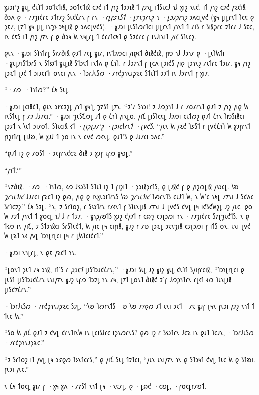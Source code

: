 𐑣𐑨𐑮𐑦'𐑟 𐑣𐑧𐑛 𐑒𐑧𐑐𐑑 𐑮𐑴𐑑𐑱𐑑𐑦𐑙, 𐑮𐑴𐑑𐑱𐑑𐑦𐑙 𐑤𐑲𐑒 𐑦𐑑 𐑢𐑪𐑟 𐑑𐑮𐑲𐑦𐑙 𐑑 𐑢𐑲𐑯𐑛 𐑦𐑑𐑕𐑧𐑤𐑓 𐑪𐑓 𐑣𐑦𐑟 𐑯𐑧𐑒. 𐑦𐑑 𐑢𐑪𐑟 𐑤𐑲𐑒 𐑢𐑷𐑒𐑦𐑙 𐑔𐑮𐑵 𐑞 ·𐑥𐑨𐑡𐑦𐑒𐑩𐑤 𐑲𐑑𐑩𐑥𐑟 𐑕𐑧𐑒𐑖𐑩𐑯 𐑝 𐑩𐑯 \emph{·𐑩𐑛𐑝𐑭𐑯𐑕𐑑 ·𐑛𐑳𐑯𐑡𐑩𐑯𐑟 𐑯 ·𐑛𐑮𐑨𐑜𐑩𐑯𐑟} 𐑮𐑵𐑤𐑚𐑫𐑒 (𐑣𐑰 𐑛𐑦𐑛𐑩𐑯𐑑 𐑐𐑤𐑱 𐑞 𐑜𐑱𐑥, 𐑚𐑳𐑑 𐑣𐑰 𐑛𐑦𐑛 𐑦𐑯𐑡𐑶 𐑮𐑰𐑛𐑦𐑙 𐑞 𐑮𐑵𐑤𐑚𐑫𐑒𐑕). ·𐑣𐑨𐑮𐑦 𐑛𐑧𐑕𐑐𐑼𐑩𐑑𐑤𐑦 𐑛𐑦𐑛𐑩𐑯𐑑 𐑢𐑪𐑯𐑑 𐑑 𐑥𐑦𐑕 𐑩 𐑕𐑦𐑙𐑜𐑩𐑤 𐑲𐑑𐑩𐑥 𐑓 𐑕𐑱𐑤, 𐑦𐑯 𐑒𐑱𐑕 𐑦𐑑 𐑢𐑪𐑟 𐑢𐑳𐑯 𐑝 𐑞 𐑔𐑮𐑰 𐑿 𐑯𐑰𐑛𐑩𐑛 𐑑 𐑒𐑩𐑥𐑐𐑤𐑰𐑑 𐑞 𐑕𐑲𐑒𐑩𐑤 𐑝 𐑦𐑯𐑓𐑦𐑯𐑦𐑑 \emph{𐑢𐑦𐑖} 𐑕𐑐𐑧𐑤𐑟.

𐑞𐑧𐑯 ·𐑣𐑨𐑮𐑦 𐑕𐑐𐑪𐑑𐑩𐑛 𐑕𐑳𐑥𐑔𐑦𐑙 𐑞𐑨𐑑 𐑥𐑱𐑛 𐑣𐑦𐑥, 𐑦𐑯𐑑𐑲𐑼𐑤𐑦 𐑢𐑦𐑞𐑬𐑑 𐑔𐑦𐑙𐑒𐑦𐑙, 𐑝𐑽 𐑪𐑓 𐑓𐑮𐑪𐑥 𐑞 ·𐑛𐑧𐑐𐑿𐑑𐑦 ·𐑣𐑧𐑛𐑥𐑦𐑕𐑑𐑮𐑩𐑕 𐑯 𐑕𐑑𐑸𐑑 𐑣𐑧𐑛𐑦𐑙 𐑕𐑑𐑮𐑱𐑑 𐑦𐑯𐑑𐑵 𐑞 𐑖𐑪𐑐, 𐑩 𐑓𐑮𐑳𐑯𐑑 𐑝 𐑚𐑤𐑵 𐑚𐑮𐑦𐑒𐑕 𐑢𐑦𐑞 𐑚𐑮𐑪𐑯𐑟-𐑥𐑧𐑑𐑩𐑤 𐑑𐑮𐑦𐑥. 𐑣𐑰 𐑢𐑪𐑟 𐑚𐑮𐑷𐑑 𐑚𐑨𐑒 𐑑 𐑮𐑦𐑨𐑤𐑦𐑑𐑦 𐑴𐑯𐑤𐑦 𐑢𐑧𐑯 ·𐑐𐑮𐑩𐑓𐑧𐑕𐑼 ·𐑥𐑩𐑒𐑜𐑪𐑯𐑨𐑜𐑷𐑤 𐑕𐑑𐑧𐑐𐑑 𐑮𐑲𐑑 𐑦𐑯 𐑓𐑮𐑳𐑯𐑑 𐑝 𐑣𐑦𐑥.

“·𐑥𐑼~·𐑐𐑪𐑑𐑼?” 𐑖𐑰 𐑕𐑧𐑛.

·𐑣𐑨𐑮𐑦 𐑚𐑤𐑦𐑙𐑒𐑑, 𐑞𐑧𐑯 𐑮𐑾𐑤𐑲𐑟𐑛 𐑢𐑪𐑑 𐑣𐑰'𐑛 𐑡𐑳𐑕𐑑 𐑛𐑳𐑯. “𐑲'𐑥 𐑕𐑪𐑮𐑦! 𐑲 𐑓𐑼𐑜𐑪𐑑 𐑓 𐑩 𐑥𐑴𐑥𐑩𐑯𐑑 𐑞𐑨𐑑 𐑲 𐑢𐑪𐑟 𐑢𐑦𐑞 𐑿 𐑦𐑯𐑕𐑑𐑧𐑛 𐑝 𐑥𐑲 𐑓𐑨𐑥𐑤𐑦.” ·𐑣𐑨𐑮𐑦 𐑡𐑧𐑕𐑗𐑼𐑛 𐑨𐑑 𐑞 𐑖𐑪𐑐 𐑢𐑦𐑯𐑛𐑴, 𐑢𐑦𐑗 𐑛𐑦𐑕𐑐𐑤𐑱𐑛 𐑓𐑲𐑼𐑦 𐑤𐑧𐑑𐑼𐑟 𐑞𐑨𐑑 𐑖𐑪𐑯 𐑐𐑽𐑕𐑦𐑙𐑤𐑦 𐑚𐑮𐑲𐑑 𐑯 𐑘𐑧𐑑 𐑮𐑦𐑥𐑴𐑑, 𐑕𐑐𐑧𐑤𐑦𐑙 𐑬𐑑 \emph{·𐑚𐑦𐑜𐑚𐑨𐑥'𐑟 ·𐑚𐑮𐑦𐑤𐑘𐑩𐑯𐑑 ·𐑚𐑫𐑒𐑕}. “𐑢𐑧𐑯 𐑿 𐑢𐑷𐑒 𐑐𐑭𐑕𐑑 𐑩 𐑚𐑫𐑒𐑖𐑪𐑐 𐑿 𐑣𐑨𐑝𐑩𐑯𐑑 𐑝𐑦𐑟𐑦𐑑𐑩𐑛 𐑚𐑦𐑓𐑹, 𐑿 𐑣𐑨𐑓 𐑑 𐑜𐑴 𐑦𐑯 𐑯 𐑤𐑫𐑒 𐑼𐑬𐑯𐑛. 𐑞𐑨𐑑'𐑕 𐑞 𐑓𐑨𐑥𐑤𐑦 𐑮𐑵𐑤.”

“𐑞𐑨𐑑 𐑦𐑟 𐑞 𐑥𐑴𐑕𐑑 ·𐑮𐑱𐑝𐑩𐑯𐑒𐑤𐑷 𐑔𐑦𐑙 𐑲 𐑣𐑨𐑝 𐑧𐑝𐑼 𐑣𐑻𐑛.”

“𐑢𐑪𐑑?”

“𐑯𐑳𐑔𐑦𐑙. ·𐑥𐑼~·𐑐𐑪𐑑𐑼, 𐑬𐑼 𐑓𐑻𐑕𐑑 𐑕𐑑𐑧𐑐 𐑦𐑟 𐑑 𐑝𐑦𐑟𐑦𐑑 ·𐑜𐑮𐑦𐑙𐑜𐑩𐑑𐑕, 𐑞 𐑚𐑨𐑙𐑒 𐑝 𐑞 𐑢𐑦𐑟𐑼𐑛𐑦𐑙 𐑢𐑻𐑤𐑛. 𐑘𐑹 \emph{𐑡𐑩𐑯𐑧𐑑𐑦𐑒} 𐑓𐑨𐑥𐑤𐑦 𐑝𐑷𐑤𐑑 𐑦𐑟 𐑞𐑺, 𐑢𐑦𐑞 𐑞 𐑦𐑯𐑣𐑧𐑮𐑦𐑑𐑩𐑯𐑕 𐑘𐑹 \emph{𐑡𐑩𐑯𐑧𐑑𐑦𐑒} 𐑐𐑺𐑩𐑯𐑑𐑕 𐑤𐑧𐑓𐑑 𐑿, 𐑯 𐑿'𐑤 𐑯𐑰𐑛 𐑥𐑳𐑯𐑦 𐑓 𐑕𐑒𐑵𐑤 𐑕𐑩𐑐𐑤𐑲𐑟.” 𐑖𐑰 𐑕𐑲𐑛. “𐑯, 𐑲 𐑕𐑩𐑐𐑴𐑟, 𐑩 𐑕𐑻𐑑𐑩𐑯 𐑩𐑥𐑬𐑯𐑑 𐑝 𐑕𐑐𐑧𐑯𐑛𐑦𐑙 𐑥𐑳𐑯𐑦 𐑓 𐑚𐑫𐑒𐑕 𐑒𐑫𐑛 𐑚𐑰 𐑦𐑒𐑕𐑒𐑿𐑟𐑛 𐑨𐑟 𐑢𐑧𐑤. 𐑞𐑴 𐑿 𐑥𐑲𐑑 𐑢𐑪𐑯𐑑 𐑑 𐑣𐑴𐑤𐑛 𐑪𐑓 𐑓 𐑩 𐑑𐑲𐑥. ·𐑣𐑪𐑜𐑢𐑹𐑑𐑕 𐑣𐑨𐑟 𐑒𐑢𐑲𐑑 𐑩 𐑤𐑸𐑡 𐑤𐑲𐑚𐑮𐑼𐑦 𐑪𐑯 ·𐑥𐑨𐑡𐑦𐑒𐑩𐑤 𐑕𐑳𐑚𐑡𐑧𐑒𐑑𐑕. 𐑯 𐑞 𐑑𐑬𐑼 𐑦𐑯 𐑢𐑦𐑗, 𐑲 𐑕𐑑𐑮𐑪𐑙𐑤𐑦 𐑕𐑩𐑕𐑐𐑧𐑒𐑑, 𐑿 𐑢𐑦𐑤 𐑚𐑰 𐑤𐑦𐑝𐑦𐑙, 𐑣𐑨𐑟 𐑩 𐑥𐑹 𐑚𐑮𐑷𐑛-𐑮𐑱𐑯𐑡𐑦𐑙 𐑤𐑲𐑚𐑮𐑼𐑦 𐑝 𐑦𐑑𐑕 𐑴𐑯. 𐑧𐑯𐑦 𐑚𐑫𐑒 𐑿 𐑚𐑷𐑑 𐑯𐑬 𐑢𐑫𐑛 𐑐𐑮𐑪𐑚𐑩𐑚𐑤𐑦 𐑚𐑰 𐑩 𐑛𐑿𐑐𐑤𐑦𐑒𐑩𐑑.”

·𐑣𐑨𐑮𐑦 𐑯𐑪𐑛𐑩𐑛, 𐑯 𐑞𐑱 𐑢𐑷𐑒𐑑 𐑪𐑯.

“𐑛𐑴𐑯𐑑 𐑜𐑧𐑑 𐑥𐑰 𐑮𐑪𐑙, 𐑦𐑑'𐑕 𐑩 \emph{𐑜𐑮𐑱𐑑} 𐑛𐑦𐑕𐑑𐑮𐑨𐑒𐑖𐑩𐑯,” ·𐑣𐑨𐑮𐑦 𐑕𐑧𐑛 𐑨𐑟 𐑣𐑦𐑟 𐑣𐑧𐑛 𐑒𐑧𐑐𐑑 𐑕𐑢𐑦𐑝𐑩𐑤𐑦𐑙, “𐑐𐑮𐑪𐑚𐑩𐑚𐑤𐑦 𐑞 𐑚𐑧𐑕𐑑 𐑛𐑦𐑕𐑑𐑮𐑨𐑒𐑖𐑩𐑯 𐑧𐑯𐑦𐑢𐑳𐑯 𐑣𐑨𐑟 𐑧𐑝𐑼 𐑑𐑮𐑲𐑛 𐑪𐑯 𐑥𐑰, 𐑚𐑳𐑑 𐑛𐑴𐑯𐑑 𐑔𐑦𐑙𐑒 𐑲'𐑝 𐑓𐑼𐑜𐑪𐑑𐑩𐑯 𐑩𐑚𐑬𐑑 𐑬𐑼 𐑐𐑧𐑯𐑛𐑦𐑙 𐑛𐑦𐑕𐑒𐑳𐑖𐑩𐑯.”

·𐑐𐑮𐑩𐑓𐑧𐑕𐑼 ·𐑥𐑩𐑒𐑜𐑪𐑯𐑨𐑜𐑷𐑤 𐑕𐑲𐑛. “𐑘𐑹 𐑐𐑺𐑩𐑯𐑑𐑕—𐑹 𐑘𐑹 𐑥𐑳𐑞𐑼 𐑨𐑑 𐑧𐑯𐑦 𐑮𐑱𐑑—𐑥𐑱 𐑣𐑨𐑝 𐑚𐑰𐑯 𐑝𐑧𐑮𐑦 𐑢𐑲𐑟 𐑯𐑪𐑑 𐑑 𐑑𐑧𐑤 𐑿.”

“𐑕𐑴 𐑿 𐑢𐑦𐑖 𐑞𐑨𐑑 𐑲 𐑒𐑫𐑛 𐑒𐑩𐑯𐑑𐑦𐑯𐑿 𐑦𐑯 𐑚𐑤𐑦𐑕𐑓𐑩𐑤 𐑦𐑜𐑯𐑼𐑩𐑯𐑕? 𐑞𐑺 𐑦𐑟 𐑩 𐑕𐑻𐑑𐑩𐑯 𐑓𐑤𐑷 𐑦𐑯 𐑞𐑨𐑑 𐑐𐑤𐑨𐑯, ·𐑐𐑮𐑩𐑓𐑧𐑕𐑼 ·𐑥𐑩𐑒𐑜𐑪𐑯𐑨𐑜𐑷𐑤.”

“𐑲 𐑕𐑩𐑐𐑴𐑟 𐑦𐑑 𐑢𐑫𐑛 𐑚𐑰 𐑮𐑭𐑞𐑼 𐑐𐑶𐑯𐑑𐑤𐑩𐑕,” 𐑞 𐑢𐑦𐑗 𐑕𐑧𐑛 𐑑𐑲𐑑𐑤𐑦, “𐑢𐑧𐑯 𐑧𐑯𐑦𐑢𐑳𐑯 𐑪𐑯 𐑞 𐑕𐑑𐑮𐑰𐑑 𐑒𐑫𐑛 𐑑𐑧𐑤 𐑿 𐑞 𐑕𐑑𐑹𐑦. 𐑝𐑧𐑮𐑦 𐑢𐑧𐑤.”

𐑯 𐑖𐑰 𐑑𐑴𐑤𐑛 𐑣𐑦𐑥 𐑝 ·𐑣𐑰-𐑣𐑵-·𐑥𐑳𐑕𐑑-𐑯𐑪𐑑-𐑚𐑰-·𐑯𐑱𐑥𐑛, 𐑞 ·𐑛𐑸𐑒 ·𐑤𐑹𐑛, ·𐑝𐑴𐑤𐑛𐑩𐑥𐑹𐑑.

